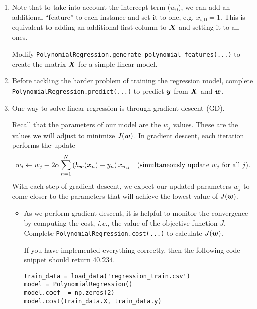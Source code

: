 \documentclass[11pt]{article}
\begin{document}
\begin{enumerate}[resume]
\item {} Note that to take into account the intercept term ($w_0$), we can add an additional ``feature'' to each instance and set it to one, e.g. $x_{i,0} = 1$. This is equivalent to adding an additional first column to $\boldsymbol{X}$ and setting it to all ones.

Modify \verb|PolynomialRegression.generate_polynomial_features(...)| to create the matrix $\boldsymbol{X}$ for a simple linear model.
\solution{
 }

\item {} Before tackling the harder problem of training the regression model, complete \\\verb|PolynomialRegression.predict(...)| to predict $\boldsymbol{y}$ from $\boldsymbol{X}$ and $\boldsymbol{w}$.
\solution{
 }

\item {} One way to solve linear regression is through gradient descent (GD).

Recall that the parameters of our model are the $w_j$ values. These are the values we will adjust to minimize $J(\boldsymbol{w})$. In gradient descent, each
iteration performs the update
\begin{equation*}
w_j \leftarrow w_j - 2  \alpha \sum_{n=1}^{N} \left( h_{\boldsymbol{w}}(\boldsymbol{x}_{n}) - y_{n} \right) x_{n,j} \textrm{\quad (simultaneously update $w_j$ for all $j$)}.
\end{equation*}
With each step of gradient descent, we expect our updated parameters $w_j$ to come closer to the parameters that will achieve the lowest value of $J(\boldsymbol{w})$.

\begin{itemize}

\item {} As we perform gradient descent, it is helpful to monitor the convergence by computing the cost, \emph{i.e.}, the value of the objective function $J$. Complete \verb|PolynomialRegression.cost(...)| to calculate $J(\boldsymbol{w})$.


If you have implemented everything correctly, then the following code snippet should return $40.234$.
\begin{verbatim}
train_data = load_data('regression_train.csv')
model = PolynomialRegression()
model.coef_ = np.zeros(2)
model.cost(train_data.X, train_data.y)
\end{verbatim}

\solution{

}
\end{itemize}
\end{enumerate}
\end{document}
